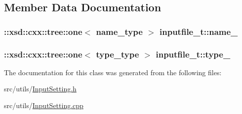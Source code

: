 \subsection{Member Data Documentation}
\hypertarget{classinputfile__t_a511fa53cd30df30388bbb0d6667e04e5}{
\subsubsection[{name\-\_\-}]{\setlength{\rightskip}{0pt plus 5cm}\-::xsd\-::cxx\-::tree\-::one$<$ {\bf name\-\_\-type} $>$ inputfile\-\_\-t\-::name\-\_\-\hspace{0.3cm}{\ttfamily [protected]}}}\label{classinputfile__t_a511fa53cd30df30388bbb0d6667e04e5}
\hypertarget{classinputfile__t_aac635b58fd41459baf72cb928c4f41b1}{
\subsubsection[{type\-\_\-}]{\setlength{\rightskip}{0pt plus 5cm}\-::xsd\-::cxx\-::tree\-::one$<$ {\bf type\-\_\-type} $>$ inputfile\-\_\-t\-::type\-\_\-\hspace{0.3cm}{\ttfamily [protected]}}}\label{classinputfile__t_aac635b58fd41459baf72cb928c4f41b1}


The documentation for this class was generated from the following files\-:\begin{DoxyCompactItemize}
\item 
src/utils/\hyperlink{InputSetting_8h}{Input\-Setting.\-h}\item 
src/utils/\hyperlink{InputSetting_8cpp}{Input\-Setting.\-cpp}\end{DoxyCompactItemize}
